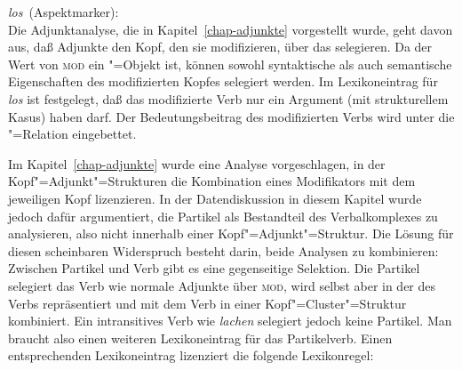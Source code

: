 \eas
\label{le-los-asp}
\mbox{\emph{los} (Aspektmarker):}\\
\zs{}
Die Adjunktanalyse, die in Kapitel~\ref{chap-adjunkte} vorgestellt wurde,
geht davon aus, daß Adjunkte den Kopf, den sie modifizieren, über das \modm selegieren.
Da der Wert von \textsc{mod} ein "=Objekt ist, können sowohl syntaktische als auch semantische
Eigenschaften des modifizierten Kopfes selegiert werden. Im Lexikoneintrag für \emph{los}
ist festgelegt, daß das modifizierte Verb nur ein Argument (mit strukturellem Kasus)
haben darf. Der Bedeutungsbeitrag des modifizierten Verbs wird unter die "=Relation
eingebettet.

Im Kapitel~\ref{chap-adjunkte} wurde eine Analyse vorgeschlagen,
in der Kopf"=Adjunkt"=Strukturen die Kombination eines Modifikators mit dem jeweiligen Kopf lizenzieren.
In der Datendiskussion in diesem Kapitel wurde jedoch dafür argumentiert,
die Partikel als Bestandteil des Verbalkomplexes zu analysieren, also nicht innerhalb einer
Kopf"=Adjunkt"=Struktur. Die Lösung für diesen scheinbaren Widerspruch besteht darin, beide Analysen zu kombinieren: Zwischen Partikel
und Verb gibt es eine gegenseitige Selektion. Die Partikel selegiert das Verb wie normale
Adjunkte über \textsc{mod}, wird selbst aber in der \subcatl des Verbs repräsentiert und mit dem
Verb in einer Kopf"=Cluster"=Struktur kombiniert. Ein intransitives Verb wie \emph{lachen} selegiert
jedoch keine Partikel. Man braucht also einen weiteren Lexikoneintrag für das Partikelverb.
Einen entsprechenden Lexikoneintrag lizenziert die folgende Lexikonregel:

